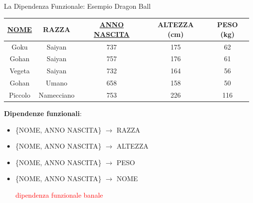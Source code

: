 %
\begin{frame}{La Dipendenza Funzionale: Esempio Dragon Ball}
\begin{table}[h]
    \centering
    \begin{tabular}{|c|c|c|c|c|}
        \hline
        \rowcolor{cyan!30} \textbf{\underline{NOME}} & \textbf{RAZZA} & \textbf{\underline{ANNO NASCITA}} & \textbf{ALTEZZA (cm)} & \textbf{PESO (kg)} \\ \hline
        Goku & Saiyan & 737 & 175 & 62 \\ \hline
        Gohan & Saiyan & 757 & 176 & 61 \\ \hline
        Vegeta & Saiyan & 732 & 164 & 56 \\ \hline
        Gohan & Umano & 658 & 158 & 50 \\ \hline
        Piccolo & Namecciano & 753 & 226 & 116 \\ \hline
    \end{tabular}
\end{table}
\pause
\textbf{Dipendenze funzionali}:
\pause
\begin{itemize}[<+->]
    \item \{NOME, ANNO NASCITA\} $ \rightarrow $ RAZZA
    \item \{NOME, ANNO NASCITA\} $ \rightarrow $ ALTEZZA
    \item \{NOME, ANNO NASCITA\} $ \rightarrow $ PESO
    \item \{NOME, ANNO NASCITA\} $ \rightarrow $ NOME 
    
    \textcolor{red}{dipendenza funzionale banale}
\end{itemize}
\end{frame}
%
